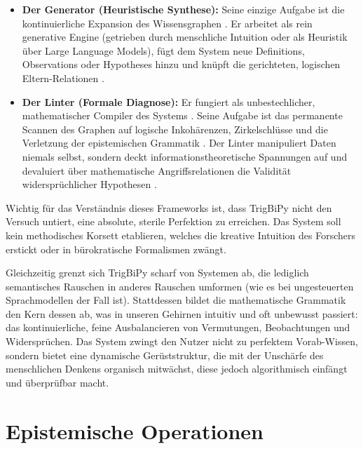 \documentclass[11pt, a4paper]{article}
\begin{document}
	\begin{itemize}
		\item \textbf{Der Generator (Heuristische Synthese):} Seine einzige Aufgabe ist die kontinuierliche Expansion des Wissensgraphen \cite{246, 248}. Er arbeitet als rein generative Engine (getrieben durch menschliche Intuition oder als Heuristik über Large Language Models), fügt dem System neue Definitions, Observations oder Hypotheses hinzu und knüpft die gerichteten, logischen Eltern-Relationen \cite{247, 324, 435}.
		\item \textbf{Der Linter (Formale Diagnose):} Er fungiert als unbestechlicher, mathematischer Compiler des Systems \cite{238, 249}. Seine Aufgabe ist das permanente Scannen des Graphen auf logische Inkohärenzen, Zirkelschlüsse und die Verletzung der epistemischen Grammatik \cite{249, 250}. Der Linter manipuliert Daten niemals selbst, sondern deckt informationstheoretische Spannungen auf und devaluiert über mathematische Angriffsrelationen die Validität widersprüchlicher Hypothesen \cite{238, 251, 323, 387, 388}.
	\end{itemize}
	
	Wichtig für das Verständnis dieses Frameworks ist, dass TrigBiPy nicht den Versuch untiert, eine absolute, sterile Perfektion zu erreichen. Das System soll kein methodisches Korsett etablieren, welches die kreative Intuition des Forschers erstickt oder in bürokratische Formalismen zwängt.
	
	Gleichzeitig grenzt sich TrigBiPy scharf von Systemen ab, die lediglich semantisches Rauschen in anderes Rauschen umformen (wie es bei ungesteuerten Sprachmodellen der Fall ist). Stattdessen bildet die mathematische Grammatik den Kern dessen ab, was in unseren Gehirnen intuitiv und oft unbewusst passiert: das kontinuierliche, feine Ausbalancieren von Vermutungen, Beobachtungen und Widersprüchen. Das System zwingt den Nutzer nicht zu perfektem Vorab-Wissen, sondern bietet eine dynamische Gerüststruktur, die mit der Unschärfe des menschlichen Denkens organisch mitwächst, diese jedoch algorithmisch einfängt und überprüfbar macht.
	
	\section{Epistemische Operationen}
	
\end{document}
